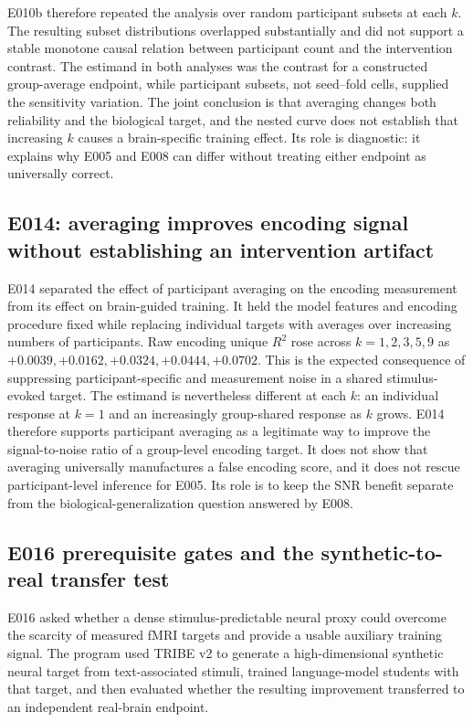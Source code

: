 E010b therefore repeated the analysis over random participant subsets at each $k$.
The resulting subset distributions overlapped substantially and did not support a stable monotone causal relation between participant count and the intervention contrast. 
The estimand in both analyses was the contrast for a constructed group-average endpoint, while participant subsets, not seed--fold cells, supplied the sensitivity variation.
The joint conclusion is that averaging changes both reliability and the biological target, and the nested curve does not establish that increasing $k$ causes a brain-specific training effect.
Its role is diagnostic: it explains why E005 and E008 can differ without treating either endpoint as universally correct.

\subsection{E014: averaging improves encoding signal without establishing an intervention artifact}
\label{sec:e014}

E014 separated the effect of participant averaging on the encoding measurement from its effect on brain-guided training.
It held the model features and encoding procedure fixed while replacing individual targets with averages over increasing numbers of participants.
Raw encoding unique $R^2$ rose across $k=1,2,3,5,9$ as $+0.0039,+0.0162,+0.0324,+0.0444,+0.0702$. 
This is the expected consequence of suppressing participant-specific and measurement noise in a shared stimulus-evoked target.
The estimand is nevertheless different at each $k$: an individual response at $k=1$ and an increasingly group-shared response as $k$ grows.
E014 therefore supports participant averaging as a legitimate way to improve the signal-to-noise ratio of a group-level encoding target.
It does not show that averaging universally manufactures a false encoding score, and it does not rescue participant-level inference for E005.
Its role is to keep the SNR benefit separate from the biological-generalization question answered by E008.

\subsection{E016 prerequisite gates and the synthetic-to-real transfer test}
\label{sec:e016}

E016 asked whether a dense stimulus-predictable neural proxy could overcome the scarcity of measured fMRI targets and provide a usable auxiliary training signal.
The program used TRIBE v2 to generate a high-dimensional synthetic neural target from text-associated stimuli, trained language-model students with that target, and then evaluated whether the resulting improvement transferred to an independent real-brain endpoint.

